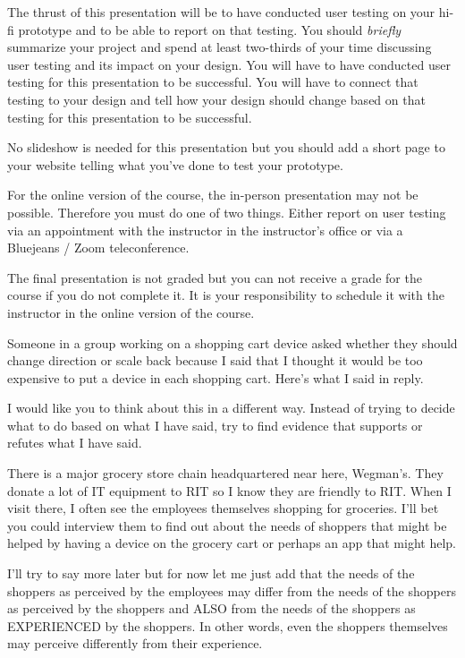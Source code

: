The thrust of this presentation will be to have conducted user testing
on your hi-fi prototype and to be able to report on that testing. You
should \emph{briefly} summarize your project and spend at least
two-thirds of your time discussing user testing and its impact on your
design. You will have to have conducted user testing for this
presentation to be successful. You will have to connect that testing to
your design and tell how your design should change based on that testing
for this presentation to be successful.

No slideshow is needed for this presentation but you should add a short
page to your website telling what you've done to test your prototype.

For the online version of the course, the in-person presentation may not
be possible. Therefore you must do one of two things. Either report on
user testing via an appointment with the instructor in the instructor's
office or via a Bluejeans / Zoom teleconference.

The final presentation is not graded but you can not receive a grade for
the course if you do not complete it. It is your responsibility to
schedule it with the instructor in the online version of the course.

\hypertarget{milestone-critiques}{%
\label{milestone-critiques}}

Someone in a group working on a shopping cart device asked whether they
should change direction or scale back because I said that I thought it
would be too expensive to put a device in each shopping cart. Here's
what I said in reply.

I would like you to think about this in a different way. Instead of
trying to decide what to do based on what I have said, try to find
evidence that supports or refutes what I have said.

There is a major grocery store chain headquartered near here, Wegman's.
They donate a lot of IT equipment to RIT so I know they are friendly to
RIT. When I visit there, I often see the employees themselves shopping
for groceries. I'll bet you could interview them to find out about the
needs of shoppers that might be helped by having a device on the grocery
cart or perhaps an app that might help.

I'll try to say more later but for now let me just add that the needs of
the shoppers as perceived by the employees may differ from the needs of
the shoppers as perceived by the shoppers and ALSO from the needs of the
shoppers as EXPERIENCED by the shoppers. In other words, even the
shoppers themselves may perceive differently from their experience.

